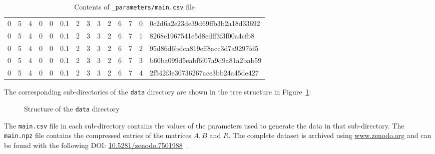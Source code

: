 \begin{table}[H]
    \centering
    \caption{Contents of \lstinline{_parameters/main.csv} file}
    \begin{tabular}{|cccccccccccccl|}
        \hline
        0 & 5 & 4 & 0 & 0 & 0.1 & 2 & 3 & 3 & 2 & 6 & 7 & 0 &
        0c2d6a2e23de39d69ffb3b2a18d33692 \\
        0 & 5 & 4 & 0 & 0 & 0.1 & 2 & 3 & 3 & 2 & 6 & 7 & 1 &
        8268e1967541e5d8edff3f3f00a4cfb8 \\
        0 & 5 & 4 & 0 & 0 & 0.1 & 2 & 3 & 3 & 2 & 6 & 7 & 2 &
        95d86d6bdca819eff8acc3d7a9297fd5 \\
        0 & 5 & 4 & 0 & 0 & 0.1 & 2 & 3 & 3 & 2 & 6 & 7 & 3 &
        b60ba099d5eabf6f07a9d9a81a2bab59 \\
        0 & 5 & 4 & 0 & 0 & 0.1 & 2 & 3 & 3 & 2 & 6 & 7 & 4 &
        2f542f3e30736267ace3bb24a45de427 \\
        \hline
    \end{tabular}
    \label{tab:parameters_csv}
\end{table}

The corresponding sub-directories of the \lstinline{data}
directory are shown in the tree structure in Figure~\ref{fig:data_directory}:

\begin{figure}[H]
    \caption{Structure of the \lstinline{data} directory}
    \label{fig:data_directory}
\end{figure}
    
The \lstinline{main.csv} file in each sub-directory contains the values of the
parameters used to generate the data in that sub-directory.
The \lstinline{main.npz} file contains the compressed entries of the matrices
\(A, B\) and \(R\).
The complete dataset is archived using \url{www.zenodo.org} and can be found
with the following DOI:
\url{10.5281/zenodo.7501988}~\cite{michalis_panayides_2023_7501988}.

